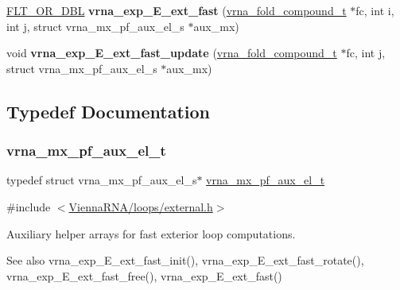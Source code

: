 \begin{DoxyCompactItemize}
\mbox{\label{group__eval__loops__ext_gacbcedbc2b94515a9dfb0b754e713ea16}} 
\mbox{\hyperlink{group__data__structures_ga31125aeace516926bf7f251f759b6126}{F\+L\+T\+\_\+\+O\+R\+\_\+\+D\+BL}} {\bfseries vrna\+\_\+exp\+\_\+\+E\+\_\+ext\+\_\+fast} (\mbox{\hyperlink{group__fold__compound_ga1b0cef17fd40466cef5968eaeeff6166}{vrna\+\_\+fold\+\_\+compound\+\_\+t}} $\ast$fc, int i, int j, struct vrna\+\_\+mx\+\_\+pf\+\_\+aux\+\_\+el\+\_\+s $\ast$aux\+\_\+mx)
\item 
\mbox{\label{group__eval__loops__ext_gaceb115e3d8855129797620b3b26882d5}} 
void {\bfseries vrna\+\_\+exp\+\_\+\+E\+\_\+ext\+\_\+fast\+\_\+update} (\mbox{\hyperlink{group__fold__compound_ga1b0cef17fd40466cef5968eaeeff6166}{vrna\+\_\+fold\+\_\+compound\+\_\+t}} $\ast$fc, int j, struct vrna\+\_\+mx\+\_\+pf\+\_\+aux\+\_\+el\+\_\+s $\ast$aux\+\_\+mx)
\end{DoxyCompactItemize}


\subsection{Typedef Documentation}
\mbox{\label{group__eval__loops__ext_gaf9d5160c11ffad3ec258124a77fee13c}} 
\subsubsection{\texorpdfstring{vrna\_mx\_pf\_aux\_el\_t}{vrna\_mx\_pf\_aux\_el\_t}}
{\footnotesize\ttfamily typedef struct vrna\+\_\+mx\+\_\+pf\+\_\+aux\+\_\+el\+\_\+s$\ast$ \mbox{\hyperlink{group__eval__loops__ext_gaf9d5160c11ffad3ec258124a77fee13c}{vrna\+\_\+mx\+\_\+pf\+\_\+aux\+\_\+el\+\_\+t}}}



{\ttfamily \#include $<$\mbox{\hyperlink{external_8h}{Vienna\+R\+N\+A/loops/external.\+h}}$>$}



Auxiliary helper arrays for fast exterior loop computations. 

\begin{DoxySeeAlso}{See also}
vrna\+\_\+exp\+\_\+\+E\+\_\+ext\+\_\+fast\+\_\+init(), vrna\+\_\+exp\+\_\+\+E\+\_\+ext\+\_\+fast\+\_\+rotate(), vrna\+\_\+exp\+\_\+\+E\+\_\+ext\+\_\+fast\+\_\+free(), vrna\+\_\+exp\+\_\+\+E\+\_\+ext\+\_\+fast() 
\end{DoxySeeAlso}


